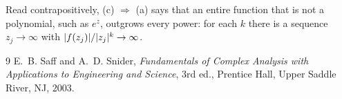 \documentclass[11pt,a4paper]{article}
\begin{document}
\begin{remark}
  Read contrapositively, (c) $\Rightarrow$ (a) says that an entire function that is
  not a polynomial, such as $e^z$, outgrows every power: for each $k$ there is a
  sequence $z_j \to \infty$ with $\lvert f(z_j)\rvert / \lvert z_j\rvert^k \to \infty$.
\end{remark}

\begin{thebibliography}{9}
   E.~B. Saff and A.~D. Snider,
    \emph{Fundamentals of Complex Analysis with Applications to Engineering
    and Science}, 3rd ed., Prentice Hall, Upper Saddle River, NJ, 2003.
\end{thebibliography}
\end{document}
